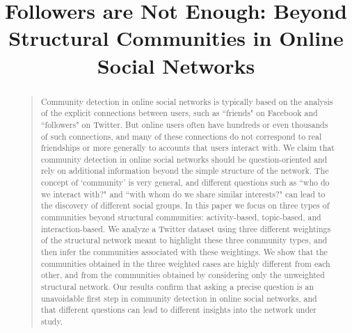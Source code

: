 \documentclass[letterpaper]{article}
\begin{document}
\title{
Followers are Not Enough: Beyond Structural Communities in Online Social Networks%
 }
 

\maketitle

\begin{abstract}
\begin{quote}
Community detection in online social networks is typically based on the analysis of the explicit connections between users, such as ``friends" on Facebook and ``followers" on Twitter. But online users often have hundreds or even thousands of such connections, and many of these connections do not correspond to real friendships or more generally to accounts that users interact with. We claim that community detection in online social networks should be question-oriented and rely on additional information beyond the simple structure of the network. The concept of `community' is very general, and different questions such as ``who do we interact with?" and ``with whom do we share similar interests?" can lead to the discovery of different social groups. In this paper we focus on three types of communities beyond structural communities: activity-based, topic-based, and interaction-based. We analyze a Twitter dataset using three different weightings of the structural network meant to highlight these three community types, and then infer the communities associated with these weightings. We show that the communities obtained in the three weighted cases are highly different from each other, and from the communities obtained by considering only the unweighted structural network. Our results confirm that asking a precise question is an unavoidable first step in community detection in online social networks, and that different questions can lead to different insights into the network under study.
\end{quote}
\end{abstract}










\end{document}
